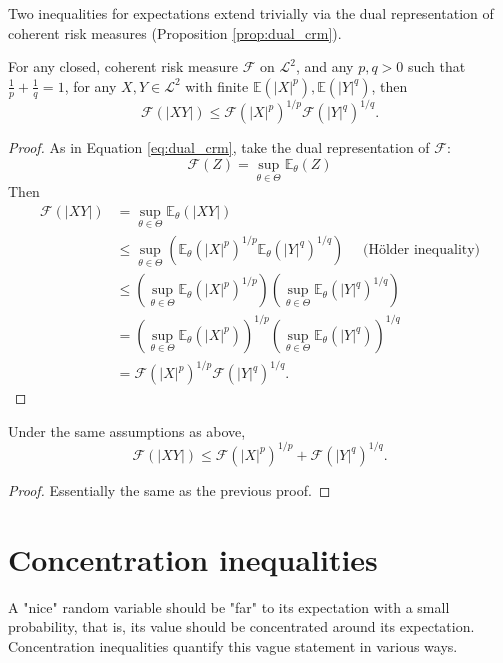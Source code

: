 Two inequalities for expectations extend trivially via the dual representation of coherent risk measures (Proposition \ref{prop:dual_crm}).
\begin{prop}
	For any closed, coherent risk measure $\mathcal{F}$ on $\mathscr{L}^2$, and any $p, q > 0$ such that $\frac 1 p + \frac 1 q = 1$, for any $X, Y\in \mathscr{L}^2$ with finite $\mathbb{E}(|X|^p), \mathbb{E}(|Y|^q)$, then 
	\begin{equation}
		\mathcal{F}(|XY|) \le \mathcal{F}(|X|^p)^{1/p} \mathcal{F}(|Y|^q)^{1/q}.
	\end{equation}
\end{prop}
\begin{proof}
	As in Equation \ref{eq:dual_crm}, take the dual representation of $\mathcal{F}$:
	$$\mathcal{F}(Z) = \sup_{\theta\in\Theta} \mathbb{E}_\theta(Z)$$
	Then
	\begin{align*}
		\mathcal{F}(|XY|) &= \sup_{\theta\in\Theta} \mathbb{E}_\theta(|XY|) \\
			&\le \sup_{\theta\in\Theta}\left( \mathbb{E}_\theta(|X|^p)^{1/p} \mathbb{E}_\theta(|Y|^q)^{1/q}\right) 
			\quad\text{ (H\"older inequality)}\\
			&\le \left(\sup_{\theta\in\Theta} \mathbb{E}_\theta(|X|^p)^{1/p}\right)
			\left(\sup_{\theta\in\Theta} \mathbb{E}_\theta(|Y|^q)^{1/q}\right)\\
			&= \left(\sup_{\theta\in\Theta} \mathbb{E}_\theta(|X|^p)\right)^{1/p}
			\left(\sup_{\theta\in\Theta} \mathbb{E}_\theta(|Y|^q)\right)^{1/q}\\
			&= \mathcal{F}(|X|^p)^{1/p}\mathcal{F}(|Y|^q)^{1/q}.
	\end{align*}
\end{proof}

\begin{prop}
	Under the same assumptions as above,
	\begin{equation}
	\mathcal{F}(|XY|) \le \mathcal{F}(|X|^p)^{1/p} + \mathcal{F}(|Y|^q)^{1/q}.
	\end{equation}
\end{prop}
\begin{proof}
	Essentially the same as the previous proof.
\end{proof}

\section{Concentration inequalities}\label{sec:tail_ineq}
A "nice" random variable should be "far" to its expectation with a small probability, that is, its value should be concentrated around its expectation. Concentration inequalities quantify this vague statement in various ways.

